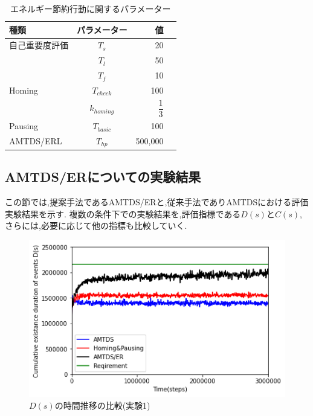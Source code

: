 \documentclass[12pt,a4j,twoside]{jarticle}
\begin{document}
\begin{table}
\begin{minipage}[t]{.55\textwidth}
      \caption{エネルギー節約行動に関するパラメーター}
      \begin{tabular}{lcrr} \\ \hline
        種類 & パラメーター & 値 \\ \hline
        自己重要度評価 & $T_s$ & 20 \\
                       & $T_l$ & 50 \\
                       & $T_f$ & 10 \\ \hline
        Homing & $T_{check}$ & 100 \\
               & $k_{homing}$ & $\dfrac{1}{3}$ \\ \hline
        Pausing & $T_{basic}$ & 100 \\ \hline  
        AMTDS/ERL & $T_{hp}$ & 500,000 \\ \hline       
      \end{tabular}
      \label{tb:3}
    \end{minipage}
  \end{table}

  \subsection{AMTDS/ERについての実験結果}
  \label{result_ER}
  この節では,提案手法であるAMTDS/ERと,従来手法でありAMTDSにおける評価実験結果を示す.
  複数の条件下での実験結果を,評価指標である$D(s)$と$C(s)$,さらには,必要に応じて他の指標も比較していく.
  

  \begin{figure}
    \centering
    \includegraphics[width=150mm]{figures/ds_graph_3600_ave_ER_Office_600.png}
    \caption{$D(s)$の時間推移の比較(実験1)}
    \label{fig:ds_ER_Office}
  \end{figure}
\end{document}
